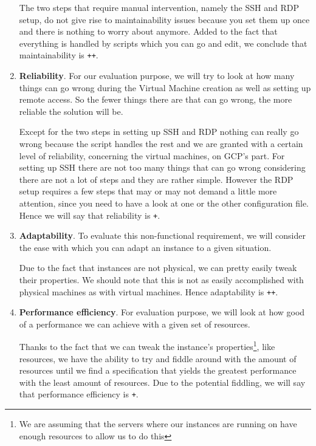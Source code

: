 \begin{enumerate}
	The two steps that require manual intervention, namely the SSH and
	RDP setup, do not give rise to maintainability issues because you
	set them up once and there is nothing to worry about anymore.
	Added to the fact that everything is handled by scripts which you
	can go and edit, we conclude that maintainability is \verb|++|.

	\item \textbf{Reliability}.  For our evaluation purpose, we will
	try to look at how many things can go wrong during the Virtual
	Machine creation as well as setting up remote access. So the fewer
	things there are that can go wrong, the more reliable the solution
	will be.

	Except for the two steps in setting up SSH and RDP nothing can
	really go wrong because the script handles the rest and we are
	granted with a certain level of reliability, concerning the
	virtual machines, on GCP's part. For setting up SSH there are not
	too many things that can go wrong considering there are not a lot
	of steps and they are rather simple. However the RDP setup
	requires a few steps that may or may not demand a little more
	attention, since you need to have a look at one or the other
	configuration file.  Hence we will say that reliability is
	\verb|+|.

	\item \textbf{Adaptability}. To evaluate this non-functional
	requirement, we will consider the ease with which you can adapt an
	instance to a given situation.
	
	Due to the fact that instances are not physical, we can pretty
	easily tweak their properties. We should note that this is not as
	easily accomplished with physical machines as with virtual
	machines. Hence adaptability is \verb|++|.

	\item \textbf{Performance efficiency}. For evaluation purpose, we
	will look at how good of a performance we can achieve with a given
	set of resources.

	Thanks to the fact that we can tweak the instance's
	properties\footnote{We are assuming that the servers where our
	instances are running on have enough resources to allow us to do
	this}, like resources, we have the ability to try and fiddle
	around with the amount of resources until we find a specification
	that yields the greatest performance with the least amount of
	resources. Due to the potential fiddling, we will say that
	performance efficiency is \verb|+|.

\end{enumerate}

